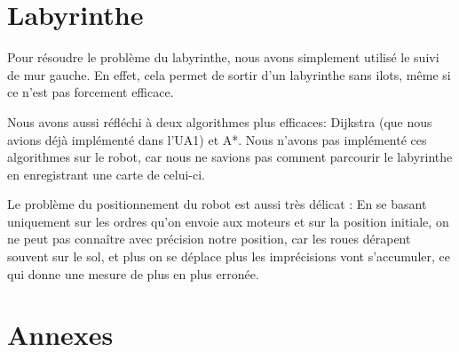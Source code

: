 \documentclass{scrartcl}
\begin{document}
\section{Labyrinthe}
  Pour résoudre le problème du labyrinthe, nous avons simplement utilisé le
  suivi de mur gauche. En effet, cela permet de sortir d'un labyrinthe sans
  ilots, même si ce n'est pas forcement efficace.

  Nous avons aussi réfléchi à deux algorithmes plus efficaces: Dijkstra (que
  nous avions déjà implémenté dans l'UA1) et A*.  Nous n'avons pas implémenté
  ces algorithmes sur le robot, car nous ne savions pas comment parcourir le
  labyrinthe en enregistrant une carte de celui-ci.

  Le problème du positionnement du robot est aussi très délicat : En se basant
  uniquement sur les ordres qu'on envoie aux moteurs et sur la position initiale,
  on ne peut pas connaître avec précision notre position, car les roues dérapent
  souvent sur le sol, et plus on se déplace plus les imprécisions vont s'accumuler,
  ce qui donne une mesure de plus en plus erronée.

\section{Annexes}
\lstlistoflistings

\end{document}
